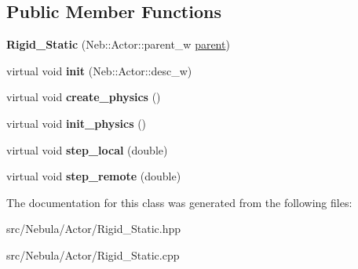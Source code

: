 \subsection*{\-Public \-Member \-Functions}
\begin{DoxyCompactItemize}
\item 
\hypertarget{classNeb_1_1Actor_1_1Rigid__Static_ab6c786470b420f443c231a26b88fe924}{{\bfseries \-Rigid\-\_\-\-Static} (\-Neb\-::\-Actor\-::parent\-\_\-w \hyperlink{classNeb_1_1Actor_1_1parent}{parent})}\label{classNeb_1_1Actor_1_1Rigid__Static_ab6c786470b420f443c231a26b88fe924}

\item 
\hypertarget{classNeb_1_1Actor_1_1Rigid__Static_ae0639d5b9d7c47732d96c41787a6a25e}{virtual void {\bfseries init} (\-Neb\-::\-Actor\-::desc\-\_\-w)}\label{classNeb_1_1Actor_1_1Rigid__Static_ae0639d5b9d7c47732d96c41787a6a25e}

\item 
\hypertarget{classNeb_1_1Actor_1_1Rigid__Static_a2ffe179c864cd2572e9c92f2b2ea9c63}{virtual void {\bfseries create\-\_\-physics} ()}\label{classNeb_1_1Actor_1_1Rigid__Static_a2ffe179c864cd2572e9c92f2b2ea9c63}

\item 
\hypertarget{classNeb_1_1Actor_1_1Rigid__Static_a743ebf9c4e047adf672e3eacd88978d8}{virtual void {\bfseries init\-\_\-physics} ()}\label{classNeb_1_1Actor_1_1Rigid__Static_a743ebf9c4e047adf672e3eacd88978d8}

\item 
\hypertarget{classNeb_1_1Actor_1_1Rigid__Static_a66a9cc916cbcab9ffa9ad6b59fa20f54}{virtual void {\bfseries step\-\_\-local} (double)}\label{classNeb_1_1Actor_1_1Rigid__Static_a66a9cc916cbcab9ffa9ad6b59fa20f54}

\item 
\hypertarget{classNeb_1_1Actor_1_1Rigid__Static_a848ce7ac85a565add902b15bc75942b8}{virtual void {\bfseries step\-\_\-remote} (double)}\label{classNeb_1_1Actor_1_1Rigid__Static_a848ce7ac85a565add902b15bc75942b8}

\end{DoxyCompactItemize}


\-The documentation for this class was generated from the following files\-:\begin{DoxyCompactItemize}
\item 
src/\-Nebula/\-Actor/\-Rigid\-\_\-\-Static.\-hpp\item 
src/\-Nebula/\-Actor/\-Rigid\-\_\-\-Static.\-cpp\end{DoxyCompactItemize}
